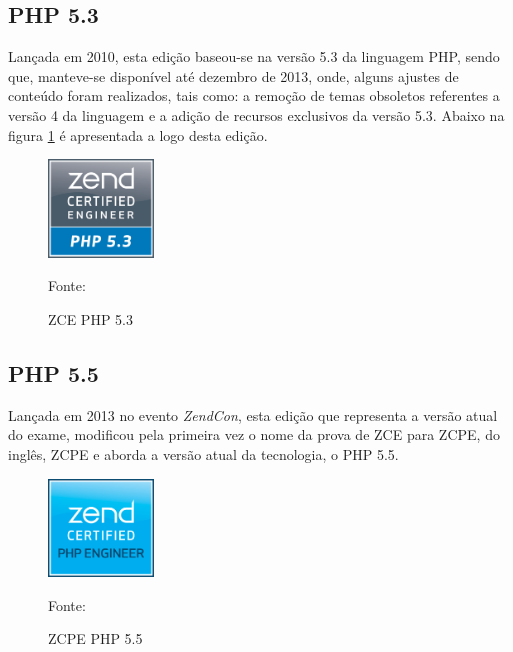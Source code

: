 \FloatBarrier 	%

\subsection{PHP 5.3}

Lançada em 2010, esta edição baseou-se na versão 5.3 da linguagem \acs{PHP},
sendo que, manteve-se disponível até dezembro de 2013, onde, alguns ajustes de
conteúdo foram realizados, tais como: a remoção de temas obsoletos referentes a versão 4
da linguagem e a adição de recursos exclusivos da versão 5.3. Abaixo na figura
\ref{fig:logoCertificationPHP53} é apresentada a logo desta edição.

\begin{figure}[h!tb]
	\caption{ZCE PHP 5.3}
	\label{fig:logoCertificationPHP53}

	\centering
	\includegraphics[width=0.25\textwidth]{images/logo/php5-3.png}

	\centering
	\footnotesize Fonte: 
\end{figure}

\FloatBarrier 	%
				

\subsection{PHP 5.5}

Lançada em 2013 no evento \textit{ZendCon}, esta edição que representa a versão
atual do exame, modificou pela primeira vez o nome da prova de \acs{ZCE} para
\acs{ZCPE}, do inglês, \acl{ZCPE} e aborda a versão atual da tecnologia, o
PHP 5.5.

\begin{figure}[h!tb]
	\caption{ZCPE PHP 5.5}
	\label{fig:logoCertificationPHP55}

	\centering
	\includegraphics[width=0.25\textwidth]{images/logo/php5-5.png}

	\centering
	\footnotesize Fonte: 
\end{figure}

\FloatBarrier 	%
			
